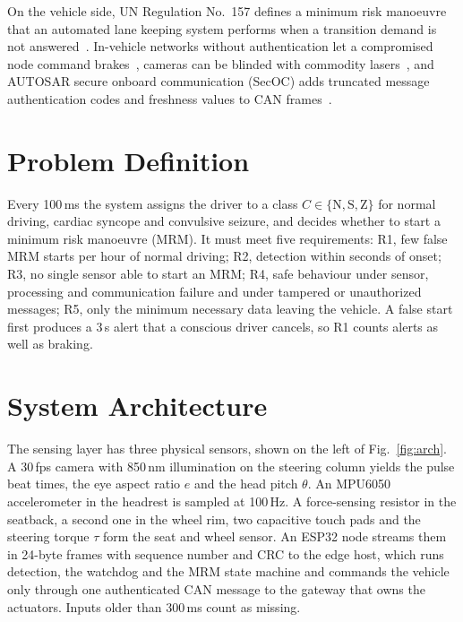 \documentclass[conference]{IEEEtran}
\begin{document}
On the vehicle side, UN Regulation No.~157 defines a minimum risk manoeuvre that an automated lane keeping system performs when a transition demand is not answered~\cite{unece157}. In-vehicle networks without authentication let a compromised node command brakes~\cite{koscher2010}, cameras can be blinded with commodity lasers~\cite{petit2015}, and AUTOSAR secure onboard communication (SecOC) adds truncated message authentication codes and freshness values to CAN frames~\cite{autosar_secoc}.

\section{Problem Definition}
Every 100\,ms the system assigns the driver to a class $C\in\{\mathrm{N},\mathrm{S},\mathrm{Z}\}$ for normal driving, cardiac syncope and convulsive seizure, and decides whether to start a minimum risk manoeuvre (MRM). It must meet five requirements: R1, few false MRM starts per hour of normal driving; R2, detection within seconds of onset; R3, no single sensor able to start an MRM; R4, safe behaviour under sensor, processing and communication failure and under tampered or unauthorized messages; R5, only the minimum necessary data leaving the vehicle. A false start first produces a 3\,s alert that a conscious driver cancels, so R1 counts alerts as well as braking.

\section{System Architecture}
The sensing layer has three physical sensors, shown on the left of Fig.~\ref{fig:arch}. A 30\,fps camera with 850\,nm illumination on the steering column yields the pulse beat times, the eye aspect ratio $e$ and the head pitch $\theta$. An MPU6050 accelerometer in the headrest is sampled at 100\,Hz. A force-sensing resistor in the seatback, a second one in the wheel rim, two capacitive touch pads and the steering torque $\tau$ form the seat and wheel sensor. An ESP32 node streams them in 24-byte frames with sequence number and CRC to the edge host, which runs detection, the watchdog and the MRM state machine and commands the vehicle only through one authenticated CAN message to the gateway that owns the actuators. Inputs older than 300\,ms count as missing.
\end{document}
